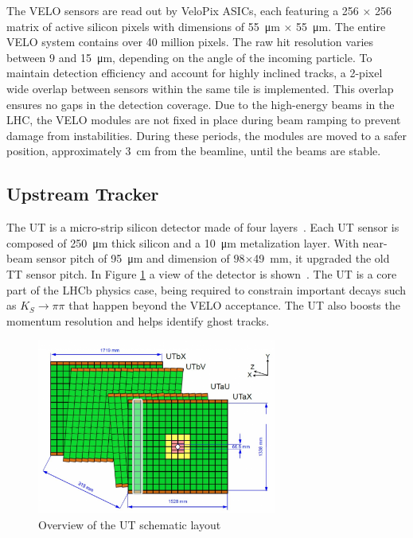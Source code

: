 The VELO sensors are read out by VeloPix ASICs, each featuring a 256 × 256 matrix of active silicon pixels with dimensions of \SI{55}{\micro\meter} × \SI{55}{\micro\meter}. The entire VELO system contains over 40 million pixels. The raw hit resolution varies between $9$ and \SI{15}{\micro\meter}, depending on the angle of the incoming particle. To maintain detection efficiency and account for highly inclined tracks, a 2-pixel wide overlap between sensors within the same tile is implemented. This overlap ensures no gaps in the detection coverage.
Due to the high-energy beams in the LHC, the VELO modules are not fixed in place during beam ramping to prevent damage from instabilities. During these periods, the modules are moved to a safer position, approximately \SI{3}{\centi\meter} from the beamline, until the beams are stable.

\subsection{Upstream Tracker}
The UT is a micro-strip silicon detector made of four layers~\cite{LHCb:2014uqj}. Each UT sensor is composed of \SI{250}{\micro\meter} thick silicon and a \SI{10}{\micro\meter} metalization layer. With near-beam sensor pitch of \SI{95}{\micro\meter} and dimension of $98$×\SI{49}{\milli\meter}, it upgraded the old TT sensor pitch. In Figure \ref{fig:UT} a view of the detector is shown~\cite{ut}. 
The UT is a core part of the LHCb physics case, being required to constrain important decays such as $K_S \rightarrow\pi\pi$ that happen beyond the VELO acceptance. The UT also boosts the momentum resolution and helps identify ghost tracks.

\begin{figure}
    \centering
    \includegraphics[width=0.7\textwidth]{figures/UT.png}
    \caption{Overview of the UT schematic layout}
    \label{fig:UT}
\end{figure}


